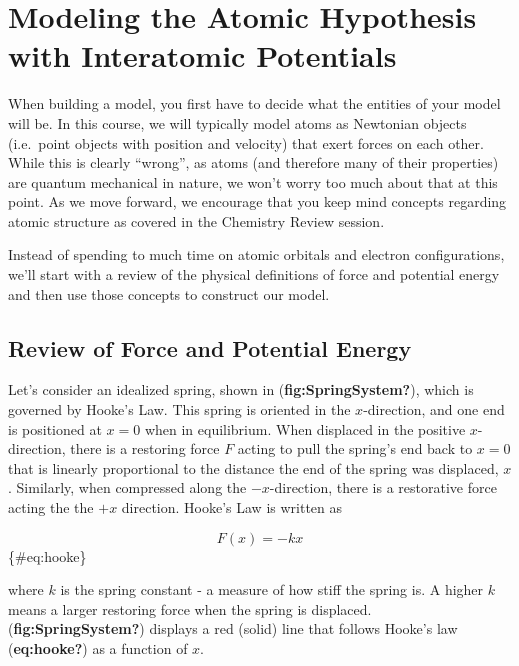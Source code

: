 \documentclass{book}
\begin{document}
\hypertarget{modeling-the-atomic-hypothesis-with-interatomic-potentials}{%
\section{Modeling the Atomic Hypothesis with Interatomic
Potentials}\label{modeling-the-atomic-hypothesis-with-interatomic-potentials}}

When building a model, you first have to decide what the entities of your
model will be. In this course, we will typically model atoms as Newtonian
objects (i.e.~point objects with position and velocity) that exert forces on
each other. While this is clearly ``wrong'', as atoms (and therefore many of
their properties) are quantum mechanical in nature, we won't worry too much
about that at this point. As we move forward, we encourage that you keep mind
concepts regarding atomic structure as covered in the Chemistry Review
session.

Instead of spending to much time on atomic orbitals and electron
configurations, we'll start with a review of the physical definitions of force
and potential energy and then use those concepts to construct our model.

\hypertarget{review-of-force-and-potential-energy}{%
\subsection{Review of Force and Potential
Energy}\label{review-of-force-and-potential-energy}}

Let's consider an idealized spring, shown in (\textbf{fig:SpringSystem?}),
which is governed by Hooke's Law. This spring is oriented in the
\(x\)-direction, and one end is positioned at \(x = 0\) when in equilibrium.
When displaced in the positive \(x\)-direction, there is a restoring force
\(F\) acting to pull the spring's end back to \(x=0\) that is linearly
proportional to the distance the end of the spring was displaced, \(x\).
Similarly, when compressed along the \(-x\)-direction, there is a restorative
force acting the the \(+x\) direction. Hooke's Law is written as

\begin{equation}   F(x) = -k x \end{equation}\{\#eq:hooke\}

where \(k\) is the spring constant - a measure of how stiff the spring is. A
higher \(k\) means a larger restoring force when the spring is displaced.
(\textbf{fig:SpringSystem?}) displays a red (solid) line that follows Hooke's
law (\textbf{eq:hooke?}) as a function of \(x\).
\end{document}
